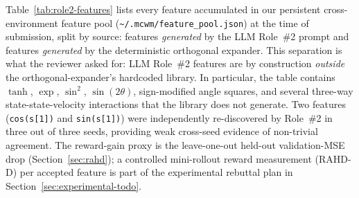 \documentclass{article}
\theoremstyle{definition}
\begin{document}
Table~\ref{tab:role2-features} lists every feature accumulated in our
persistent cross-environment feature pool
(\texttt{\textasciitilde/.mcwm/feature\_pool.json}) at the time of
submission, split by source: features \emph{generated} by the LLM
Role~\#2 prompt and features \emph{generated} by the deterministic
orthogonal expander.  This separation is what the reviewer asked for:
LLM Role~\#2 features are by construction \emph{outside} the
orthogonal-expander's hardcoded library.  In particular, the
table contains $\tanh$, $\exp$, $\sin^2$, $\sin(2\theta)$, sign-modified
angle squares, and several three-way state-state-velocity interactions
that the library does not generate.  Two features (\texttt{cos(s[1])}
and \texttt{sin(s[1])}) were independently re-discovered by Role~\#2
in three out of three seeds, providing weak cross-seed evidence of
non-trivial agreement.  The reward-gain proxy is the leave-one-out
held-out validation-MSE drop (Section~\ref{sec:rahd}); a controlled
mini-rollout reward measurement (RAHD-D) per accepted feature is part
of the experimental rebuttal plan in Section~\ref{sec:experimental-todo}.
\end{document}

